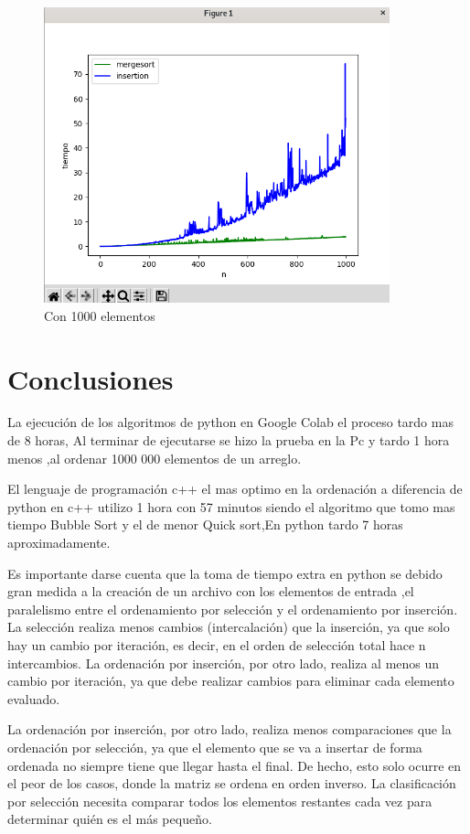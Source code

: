 \documentclass[a4paper]{article}
\begin{document}
\begin{figure}[H]%

\centering
\includegraphics[width=10cm]{imagenes/merge.png}
\caption{Con 1000 elementos}

\end{figure}
\section{Conclusiones}

La ejecución de los algoritmos de python  en Google Colab el proceso tardo mas de 8 horas, Al terminar de ejecutarse se hizo la prueba en la Pc y tardo 1 hora  menos ,al ordenar 1000 000 elementos de un arreglo.

El lenguaje de programación c++ el mas optimo  en la ordenación a diferencia de python en c++ utilizo  1 hora con 57 minutos  siendo el algoritmo que tomo mas tiempo Bubble Sort y el de menor Quick sort,En  python tardo 7 horas aproximadamente.

Es importante darse cuenta  que la toma de tiempo extra en python se debido gran medida a la creación de un archivo con los elementos de entrada  ,el paralelismo entre el ordenamiento por selección y el ordenamiento por inserción. La selección realiza menos cambios (intercalación) que la inserción, ya que solo hay un cambio por iteración, es decir, en el orden de selección total hace n intercambios. La ordenación por inserción, por otro lado, realiza al menos un cambio por iteración, ya que debe realizar cambios para eliminar cada elemento evaluado.

La ordenación por inserción, por otro lado, realiza menos comparaciones que la ordenación por selección, ya que el elemento que se va a insertar de forma ordenada no siempre tiene que llegar hasta el final. De hecho, esto solo ocurre en el peor de los casos, donde la matriz se ordena en orden inverso. La clasificación por selección necesita comparar todos los elementos restantes cada vez para determinar quién es el más pequeño.
\end{document}
